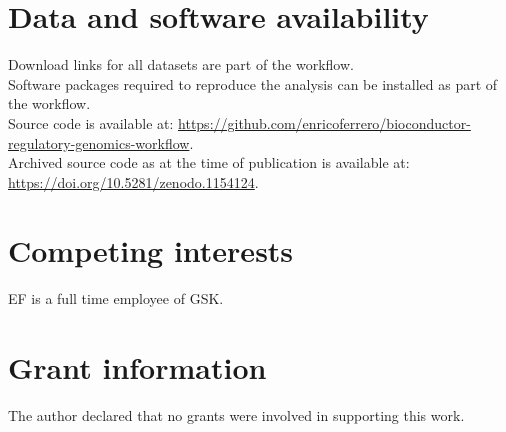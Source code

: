 \documentclass[9pt,a4paper,]{extarticle}
\theoremstyle{definition}
\theoremstyle{definition}
\theoremstyle{definition}
\theoremstyle{remark}
\begin{document}
\section{Data and software availability}\label{data-and-software-availability}

Download links for all datasets are part of the workflow.\\
Software packages required to reproduce the analysis can be installed as part of the workflow.\\
Source code is available at: \url{https://github.com/enricoferrero/bioconductor-regulatory-genomics-workflow}.\\
Archived source code as at the time of publication is available at: \url{https://doi.org/10.5281/zenodo.1154124}.

\section{Competing interests}\label{competing-interests}

EF is a full time employee of GSK.

\section{Grant information}\label{grant-information}

The author declared that no grants were involved in supporting this work.

\renewcommand\refname{References}
{\small}
\end{document}
